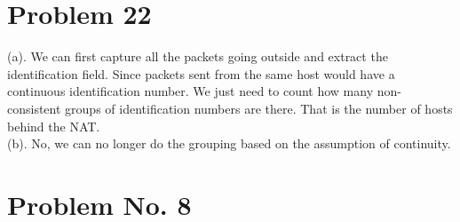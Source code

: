 \documentclass[titlepage, paper=a4, fontsize=11pt]{scrartcl} %
\numberwithin{equation}{section} %
\numberwithin{table}{section} %
\begin{document}

\section*{Problem 22}
(a).
We can first capture all the packets going outside and extract the identification field. Since packets sent from the same host would have a continuous identification number. We just need to count how many non-consistent groups of identification numbers are there. That is the number of hosts behind the NAT. \\

(b).
No, we can no longer do the grouping based on the assumption of continuity. \\





\section*{Problem No. 8}
\end{document}

